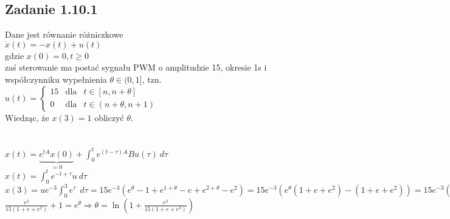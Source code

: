 \subsection*{Zadanie 1.10.1} {\color{darkgray}
	Dane jest równanie różniczkowe\\
	$\dot{x}(t)=-x(t)+u(t)$\\
	gdzie $x(0)=0, t\geqslant 0$\\
	zaś sterowanie ma postać sygnału PWM o amplitudzie 15, okresie 1s i współczynniku wypełnienia $\theta \in (0,1]$, tzn.\\
	$u(t)=\left\{ \begin{array}{ccl} 15 &\text{dla} & t\in [n,n+\theta] \\ 0 & \text{dla} &t \in(n+\theta, n+1)\end{array}\right.$\\
	Wiedząc, że $x(3)=1$ obliczyć $\theta$.\\
}\lineh
\\\\
$x(t)=\underbrace{e^{tA}x(0)}_{=0}+\int^t_0 e^{(t-\tau)A}Bu(\tau)\ d\tau$\\
$x(t)=\int^t_0 e^{-t+\tau}u \ d\tau$\\
$x(3)=ue^{-3}\int_0^3e^\tau \ \ d\tau=15e^{-3}(e^\theta-1+e^{1+\theta}-e+e^{2+\theta}-e^2)=15e^{-3}(e^\theta(1+e+e^2)-(1+e+e^2))=15e^{-3}((e^\theta-1)(1+e+e^2))=\boxed{1}$\\
$\frac{e^3}{15(1+e+e^2)}+1=e^\theta \Rightarrow \boxed{\theta=\ln(1+\frac{e^3}{15(1+e+e^2)})}$\\

